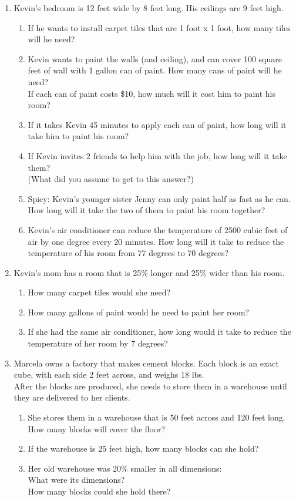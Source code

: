 \documentclass[12pt, twoside]{article}
\begin{document}
\begin{enumerate}
\newpage
\item Kevin’s bedroom is 12 feet wide by 8 feet long. His ceilings are 9 feet high.
\begin{enumerate}
  \item If he wants to install carpet tiles that are 1 foot x 1 foot, how many tiles will he need?
  \item Kevin wants to paint the walls (and ceiling), and can cover 100 square feet of wall with 1 gallon can of paint. How many cans of paint will he need? \\
   If each can of paint costs \$10, how much will it cost him to paint his room?
  \item If it takes Kevin 45 minutes to apply each can of paint, how long will it take him to paint his room?
  \item If Kevin invites 2 friends to help him with the job, how long will it take them? \\ 
  (What did you assume to get to this answer?)
  \item Spicy: Kevin’s younger sister Jenny can only paint half as fast as he can. How long will it take the two of them to paint his room together?
  \item Kevin’s air conditioner can reduce the temperature of 2500 cubic feet of air by one degree every 20 minutes. How long will it take to reduce the temperature of his room from 77 degrees to 70 degrees?
\end{enumerate}

\item Kevin’s mom has a room that is 25\% longer and 25\% wider than his room.
\begin{enumerate}
  \item How many carpet tiles would she need?
  \item How many gallons of paint would he need to paint her room?
  \item If she had the same air conditioner, how long would it take to reduce the temperature of her room by 7 degrees?
\end{enumerate}

\item Marcela owns a factory that makes cement blocks. Each block is an exact cube, with each side 2 feet across, and weighs 18 lbs. \\
After the blocks are produced, she needs to store them in a warehouse until they are delivered to her clients.
\begin{enumerate}
  \item She stores them in a warehouse that is 50 feet across and 120 feet long. How many blocks will cover the floor?
  \item If the warehouse is 25 feet high, how many blocks can she hold?
  \item Her old warehouse was 20\% smaller in all dimensions: \\
    What were its dimensions? \\
    How many blocks could she hold there?
\end{enumerate}


\end{enumerate}
\end{document}
